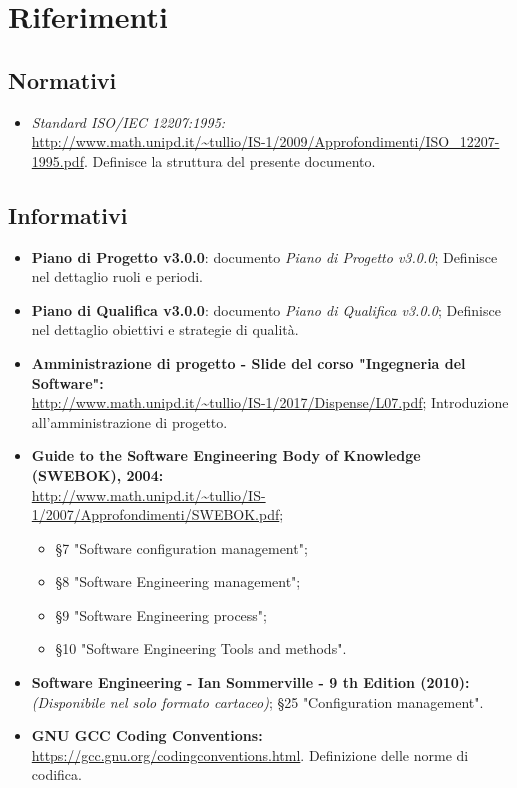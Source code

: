 \documentclass[./NormediProgetto.tex]{subfiles}
\begin{document}
\section{Riferimenti}

\subsection*{Normativi}

\begin{itemize}
	\item \textit{Standard ISO/IEC 12207:1995:}\\
	 \url{http://www.math.unipd.it/~tullio/IS-1/2009/Approfondimenti/ISO_12207-1995.pdf}.
	 \subitem Definisce la struttura del presente documento.
\end{itemize}

\subsection*{Informativi}

\begin{itemize}
	\item \textbf{Piano di Progetto v3.0.0}: documento \textit{Piano di Progetto v3.0.0};
		\subitem Definisce nel dettaglio ruoli e periodi.
	\item \textbf{Piano di Qualifica v3.0.0}: documento \textit{Piano di Qualifica v3.0.0};
		\subitem Definisce nel dettaglio obiettivi e strategie di qualità.
	\item \textbf{Amministrazione di progetto - Slide del corso "Ingegneria del Software":}\\	\url{http://www.math.unipd.it/~tullio/IS-1/2017/Dispense/L07.pdf};
		\subitem Introduzione all'amministrazione di progetto.
	\item \textbf{Guide to the Software Engineering Body of Knowledge (SWEBOK), 2004:}\\
	\url{http://www.math.unipd.it/~tullio/IS-1/2007/Approfondimenti/SWEBOK.pdf}; 
		\begin{itemize}
			\item §7 "Software configuration management";
			\item §8 "Software Engineering management";
			\item §9 "Software Engineering process";
			\item §10 "Software Engineering Tools and methods".
		\end{itemize}
	\item \textbf{Software Engineering - Ian Sommerville - 9 th Edition (2010):}
		\subitem \textit{(Disponibile nel solo formato cartaceo)};
		\subitem §25 "Configuration management".
	\item \textbf{GNU GCC Coding Conventions:}\\ \url{https://gcc.gnu.org/codingconventions.html}.
		\subitem Definizione delle norme di codifica.
\end{itemize}
\end{document}
